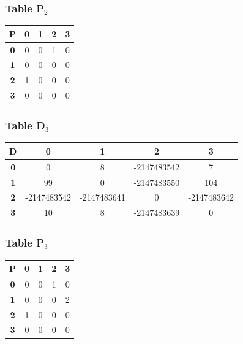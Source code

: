 \documentclass{beamer}
\begin{document}
\begin{frame}
\frametitle{Table P$_{2}$}
\begin{center}
    \begin{tabular}{|c||c|c|c|c|}
        \hline
        \textbf{P} & \textbf{0} & \textbf{1} & \textbf{2} & \textbf{3} \\
        \hline
        \hline
        \textbf{0}& 0 & 0 & \cellcolor[HTML]{D74894}1 & 0 \\
        \hline
        \textbf{1}& 0 & 0 & 0 & 0 \\
        \hline
        \textbf{2}& \cellcolor[HTML]{D74894}1 & 0 & 0 & 0 \\
        \hline
        \textbf{3}& 0 & 0 & 0 & 0 \\
        \hline
    \end{tabular}
\end{center}


\end{frame}





\begin{frame}
\frametitle{Table D$_{3}$}
\begin{center}
    \begin{tabular}{|c||c|c|c|c|}
        \hline
        \textbf{D} & \textbf{0} & \textbf{1} & \textbf{2} & \textbf{3} \\
        \hline
        \hline
        \textbf{0}& 0 & 8 & -2147483542 & 7 \\
        \hline
        \textbf{1}& 99 & 0 & -2147483550 & \cellcolor[HTML]{D74894}104 \\
        \hline
        \textbf{2}& -2147483542 & -2147483641 & 0 & -2147483642 \\
        \hline
        \textbf{3}& 10 & 8 & -2147483639 & 0 \\
        \hline
    \end{tabular}
\end{center}


\end{frame}





\begin{frame}
\frametitle{Table P$_{3}$}
\begin{center}
    \begin{tabular}{|c||c|c|c|c|}
        \hline
        \textbf{P} & \textbf{0} & \textbf{1} & \textbf{2} & \textbf{3} \\
        \hline
        \hline
        \textbf{0}& 0 & 0 & 1 & 0 \\
        \hline
        \textbf{1}& 0 & 0 & 0 & \cellcolor[HTML]{D74894}2 \\
        \hline
        \textbf{2}& 1 & 0 & 0 & 0 \\
        \hline
        \textbf{3}& 0 & 0 & 0 & 0 \\
        \hline
    \end{tabular}
\end{center}


\end{frame}
\end{document}
